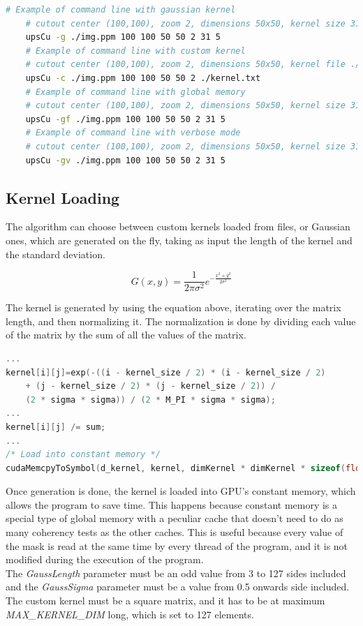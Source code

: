 \begin{lstlisting}[language=bash]
    # Example of command line with gaussian kernel
    # cutout center (100,100), zoom 2, dimensions 50x50, kernel size 31, sigma 5
    upsCu -g ./img.ppm 100 100 50 50 2 31 5 
    # Example of command line with custom kernel
    # cutout center (100,100), zoom 2, dimensions 50x50, kernel file ./kernel.txt
    upsCu -c ./img.ppm 100 100 50 50 2 ./kernel.txt
    # Example of command line with global memory
    # cutout center (100,100), zoom 2, dimensions 50x50, kernel size 31, sigma 5
    upsCu -gf ./img.ppm 100 100 50 50 2 31 5 
    # Example of command line with verbose mode
    # cutout center (100,100), zoom 2, dimensions 50x50, kernel size 31, sigma 5
    upsCu -gv ./img.ppm 100 100 50 50 2 31 5
\end{lstlisting}

    \subsection{Kernel Loading}
    The algorithm can choose between custom kernels loaded from files, or Gaussian ones, which are generated on the fly,
    taking as input the length of the kernel and the standard deviation.
    
    \begin{equation}
        \label{eq:gauss}
        G(x,y) = \frac{1}{2\pi\sigma^2}e^{-\frac{x^2+y^2}{2\sigma^2}}
    \end{equation}
    
    The kernel is generated by using the equation above, iterating over the matrix length, 
    and then normalizing it. The normalization is done by dividing each value of the matrix by the sum of all the values of the matrix.
    \noindent\small\begin{lstlisting}[language=C]
...
kernel[i][j]=exp(-((i - kernel_size / 2) * (i - kernel_size / 2)
    + (j - kernel_size / 2) * (j - kernel_size / 2)) / 
    (2 * sigma * sigma)) / (2 * M_PI * sigma * sigma);
...
kernel[i][j] /= sum;
...
/* Load into constant memory */
cudaMemcpyToSymbol(d_kernel, kernel, dimKernel * dimKernel * sizeof(float));
    \end{lstlisting}

    Once generation is done, the kernel is loaded into 
    GPU's constant memory, which allows the program to save time. This happens because constant memory is a special type of global memory 
    with a peculiar cache that doesn’t need to do as many coherency tests as the other caches. This is useful because every value of the mask is read at the same 
    time by every thread of the program, and it is not modified during the execution of the program.\\
    The \textit{GaussLength} parameter must be an odd value from 3 to 127 sides included and the \textit{GaussSigma} parameter must be a value from 0.5 onwards side included.
    The custom kernel must be a square matrix, and it has to be at maximum \textit{MAX\_KERNEL\_DIM} long, which is set to 127 elements.

